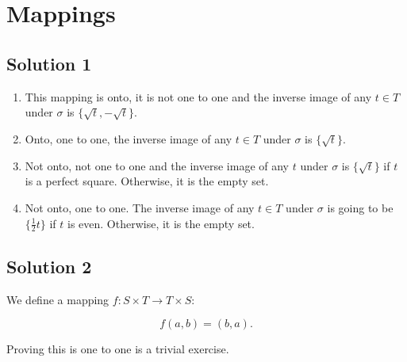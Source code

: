 \section{Mappings}

\subsection{Solution 1}

\begin{enumerate}
  \item This mapping is onto, it is not one to one and the inverse
    image of any \( t \in T  \) under \( \sigma  \) is \( \{\sqrt{t}, - \sqrt{t} \}     \).

  \item Onto, one to one, the inverse image of any \( t \in T \) under
      \( \sigma  \) is \( \{\sqrt{t}\}     \).

  \item Not onto, not one to one and the inverse image of any \( t \) under \( \sigma  \) is \( \{\sqrt{t}\} \) if \( t  \) is a perfect square.
    Otherwise, it is the empty set.

  \item Not onto, one to one. The inverse image of any \( t \in  T \) under \( \sigma  \) is going to be \( \{\frac{1}{2}t\}   \) if \( t  \) is even.
    Otherwise, it is the empty set.
\end{enumerate}

\subsection{Solution 2}

We define a mapping \( f \colon  S \times T \to T \times S \colon  \)

\[
  f \left(a,b  \right) = \left( b, a \right)
.\] 

Proving this is one to one is a trivial exercise.

